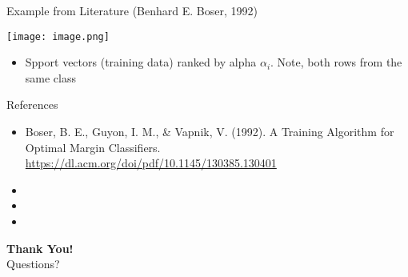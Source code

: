 \documentclass{beamer}
\begin{document}
\begin{frame}[t]{Example from Literature (Benhard E. Boser, 1992)}
\vspace{0.4cm}


\centering
\texttt{[image: image.png]}



\begin{itemize}
\item Spport vectors (training data) ranked by alpha $\alpha_i$. Note, both rows from the same class
\end{itemize}


\end{frame}






















\begin{frame}[t]{References}\vspace{1.5cm}

\begin{itemize}
    \item Boser, B. E., Guyon, I. M., & Vapnik, V. (1992). A Training Algorithm for Optimal Margin Classifiers. \url {https://dl.acm.org/doi/pdf/10.1145/130385.130401}
    \vspace{0.2cm}

    \item 

    \vspace{0.2cm}
    
    \item 
    
    \item 
\end{itemize}
\end{frame}

\begin{frame}[plain]
\centering
\vspace{2cm}
{\Huge \textbf{Thank You!}} \\[1cm]
{\Large Questions?}
\end{frame}
\end{document}
